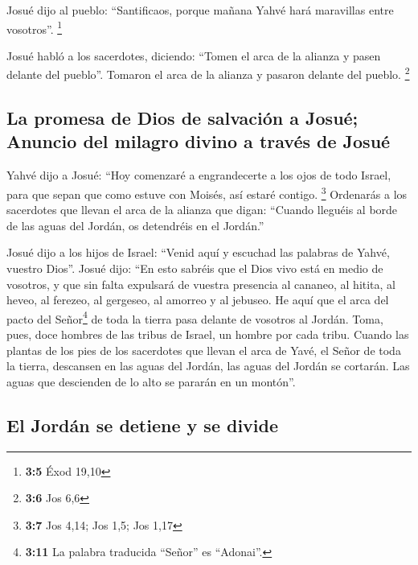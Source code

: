  Josué dijo al pueblo: ``Santificaos, porque mañana Yahvé
hará maravillas entre vosotros''. \footnote{\textbf{3:5} Éxod 19,10}

 Josué habló a los sacerdotes, diciendo: ``Tomen el arca
de la alianza y pasen delante del pueblo''. Tomaron el arca de la
alianza y pasaron delante del pueblo. \footnote{\textbf{3:6} Jos 6,6}

\hypertarget{la-promesa-de-dios-de-salvaciuxf3n-a-josuuxe9-anuncio-del-milagro-divino-a-travuxe9s-de-josuuxe9}{%
\subsection{La promesa de Dios de salvación a Josué; Anuncio del milagro
divino a través de
Josué}\label{la-promesa-de-dios-de-salvaciuxf3n-a-josuuxe9-anuncio-del-milagro-divino-a-travuxe9s-de-josuuxe9}}

 Yahvé dijo a Josué: ``Hoy comenzaré a engrandecerte a los
ojos de todo Israel, para que sepan que como estuve con Moisés, así
estaré contigo. \footnote{\textbf{3:7} Jos 4,14; Jos 1,5; Jos 1,17}
 Ordenarás a los sacerdotes que llevan el arca de la
alianza que digan: ``Cuando lleguéis al borde de las aguas del Jordán,
os detendréis en el Jordán.''

 Josué dijo a los hijos de Israel: ``Venid aquí y escuchad
las palabras de Yahvé, vuestro Dios''.  Josué dijo: ``En
esto sabréis que el Dios vivo está en medio de vosotros, y que sin falta
expulsará de vuestra presencia al cananeo, al hitita, al heveo, al
ferezeo, al gergeseo, al amorreo y al jebuseo.  He aquí
que el arca del pacto del Señor\footnote{\textbf{3:11} La palabra
  traducida ``Señor'' es ``Adonai''.} de toda la tierra pasa delante de
vosotros al Jordán.  Toma, pues, doce hombres de las
tribus de Israel, un hombre por cada tribu.  Cuando las
plantas de los pies de los sacerdotes que llevan el arca de Yavé, el
Señor de toda la tierra, descansen en las aguas del Jordán, las aguas
del Jordán se cortarán. Las aguas que descienden de lo alto se pararán
en un montón''.

\hypertarget{el-jorduxe1n-se-detiene-y-se-divide}{%
\subsection{El Jordán se detiene y se
divide}\label{el-jorduxe1n-se-detiene-y-se-divide}}

